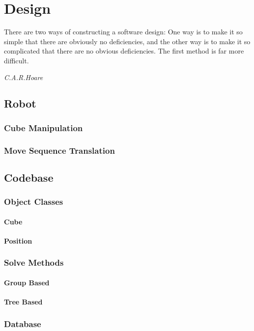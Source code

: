 \documentclass{report}
\begin{document}
    \newpage
    \chapter{Design}
    \epigraph{There are two ways of constructing a software design: One way is to make it so simple that there are obviously no deficiencies, and the other way is to make it so complicated that there are no obvious deficiencies. The first method is far more difficult.}{\textit{C.A.R.Hoare\cite{Hoare1981}}}
    \section{Robot}
    \subsection{Cube Manipulation}
    \subsection{Move Sequence Translation}
    \section{Codebase}
    \subsection{Object Classes}
    \subsubsection{Cube}
    \subsubsection{Position}
    \subsection{Solve Methods}
    \subsubsection{Group Based}
    \subsubsection{Tree Based}
    \subsection{Database}
    
\end{document}
